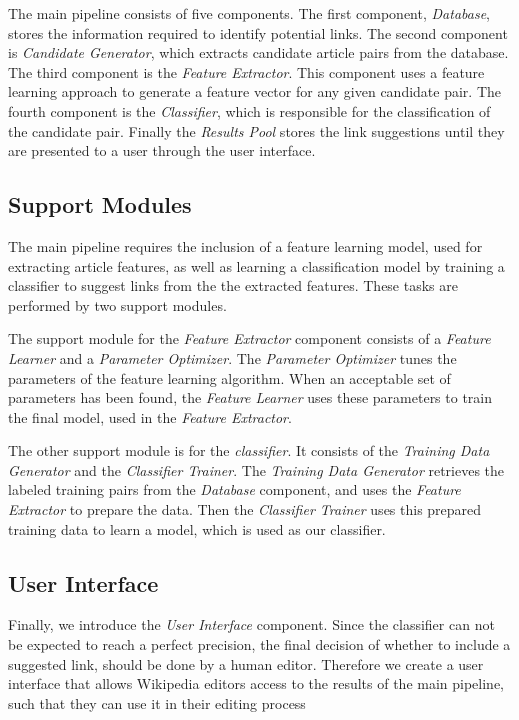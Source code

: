 The main pipeline consists of five components. The first component, \emph{Database}, stores the information required to identify potential links. The second component is \emph{Candidate Generator}, which extracts candidate article pairs from the database. The third component is the \emph{Feature Extractor}. This component uses a feature learning approach to generate a feature vector for any given candidate pair. The fourth component is the \emph{Classifier}, which is responsible for the classification of the candidate pair. Finally the \emph{Results Pool} stores the link suggestions until they are presented to a user through the user interface.

\subsection{Support Modules}
The main pipeline requires the inclusion of a feature learning model, used for extracting article features, as well as learning a classification model by training a classifier to suggest links from the the extracted features. These tasks are performed by two support modules.

The support module for the \emph{Feature Extractor} component consists of a \emph{Feature Learner} and a \emph{Parameter Optimizer}. The \emph{Parameter Optimizer} tunes the parameters of the feature learning algorithm. When an acceptable set of parameters has been found, the \emph{Feature Learner} uses these parameters to train the final model, used in the \emph{Feature Extractor}.

The other support module is for the \emph{classifier}. It consists of the \emph{Training Data Generator} and the \emph{Classifier Trainer}. The \emph{Training Data Generator} retrieves the labeled training pairs from the \emph{Database} component, and uses the \emph{Feature Extractor} to prepare the data. Then the \emph{Classifier Trainer} uses this prepared training data to learn a model, which is used as our classifier.

\subsection{User Interface}
Finally, we introduce the \emph{User Interface} component. Since the classifier can not be expected to reach a perfect precision, the final decision of whether to include a suggested link, should be done by a human editor. Therefore we create a user interface that allows Wikipedia editors access to the results of the main pipeline, such that they can use it in their editing process

